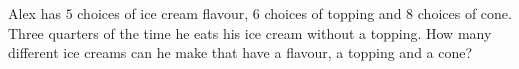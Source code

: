 Alex has $5$ choices of ice cream flavour, $6$ choices of topping and $8$ choices of cone. Three quarters of the time he eats his ice cream without a topping. How many different ice creams can he make that have a flavour, a topping and a cone?
